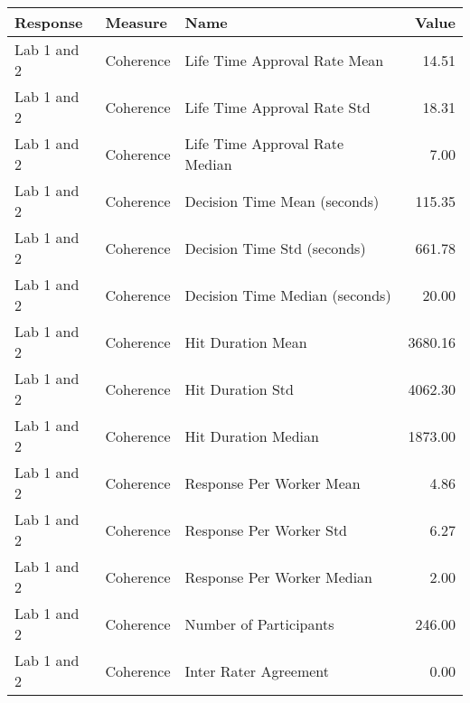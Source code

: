 \begin{tabular}{lllr}
\toprule
Response & Measure & Name & Value \\
\midrule
Lab 1 and 2 & Coherence & Life Time Approval Rate Mean & 14.51 \\
Lab 1 and 2 & Coherence & Life Time Approval Rate Std & 18.31 \\
Lab 1 and 2 & Coherence & Life Time Approval Rate Median & 7.00 \\
Lab 1 and 2 & Coherence & Decision Time Mean (seconds) & 115.35 \\
Lab 1 and 2 & Coherence & Decision Time Std (seconds) & 661.78 \\
Lab 1 and 2 & Coherence & Decision Time Median (seconds) & 20.00 \\
Lab 1 and 2 & Coherence & Hit Duration Mean & 3680.16 \\
Lab 1 and 2 & Coherence & Hit Duration Std & 4062.30 \\
Lab 1 and 2 & Coherence & Hit Duration Median & 1873.00 \\
Lab 1 and 2 & Coherence & Response Per Worker Mean & 4.86 \\
Lab 1 and 2 & Coherence & Response Per Worker Std & 6.27 \\
Lab 1 and 2 & Coherence & Response Per Worker Median & 2.00 \\
Lab 1 and 2 & Coherence & Number of Participants & 246.00 \\
Lab 1 and 2 & Coherence & Inter Rater Agreement & 0.00 \\
\bottomrule
\end{tabular}
